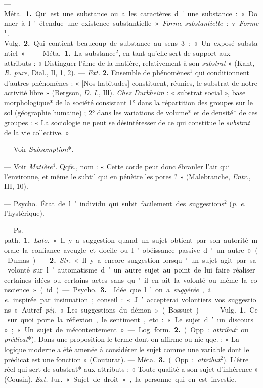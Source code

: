 \begin{itemize}[leftmargin=1cm, label=, itemsep=1pt]
 — \si{Méta.} {\bf 1.} Qui est une substance ou a les
caractères d'une substance : « Donner à l'étendue une existence
substantielle ». {\it Forme substantielle} : v. {\it Forme}$^1$. —
\si{Vulg.}  {\bf 2.} Qui contient beaucoup de substance au sens 3 : « Un
exposé substantiel. »

 — \si{Méta.} {\bf 1.} La
substance$^2$, en tant qu’elle sert de
support aux attributs : « Distinguer l'âme de la matière, relativement à son
{\it substrat} » (Kant, {\it R. pure}, Dial., Il, 1, 2). — {\it Ext.}
{\bf 2.} Ensemble de phénomènes$^1$ qui conditionnent d’autres phénomènes :
« [Nos habitudes] constituent, réunies, le substrat de notre activité libre
» (Bergson, {\it D. I.}, Ill). {\it Chez Durkheim} : « substrat social »,
base morphologique* de la société consistant 1° dans la répartition des
groupes sur le sol (géographie humaine) ; 2° dans les variations de volume*
et de densité* de ces groupes : « La sociologie ne peut se désintéresser de
ce qui constitue le {\it substrat} de la vie collective. »

 — Voir {\it Subsomption}*.

 — Voir {\it Matière}$^4$. Qqfs., nom : « Cette corde peut donc
ébranler l’air qui l’environne, et même le subtil qui en pénètre les pores ?
» (Malebranche, {\it Entr.}, III, 10).

 — \si{Psycho.} État de l’individu qui subit facilement
des suggestions$^2$ ({\it p. e.} l’hystérique).

 — \si{Ps. path.} {\bf 1.} {\it Lato.} « Il y a suggestion
quand un sujet obtient par son autorité morale la confiance aveugle et
docile ou l'obéissance passive d’un autre » (Dumas). — {\bf 2.} {\it Str.} «
Il y a encore suggestion lorsqu’un sujet agit par sa volonté sur
l’automatisme d’un autre sujet au point de lui faire réaliser certaines
idées ou certains actes sans qu'il en ait la volonté ou même la conscience
» (id.).

— \si{Psycho.} {\bf 3.}  Idée que l’on a {\it suggérée},
{\it i. e.} inspirée par insinuation ; conseil : « J’accepterai volontiers
vos suggestions ». Autref. {\it péj.} « Les suggestions du démon » (Bossuet).

 —  \si{Vulg.} {\bf 1.} Ce sur quoi porte la
réflexion, le sentiment, etc. : « Le sujet d’un discours »; « Un sujet de
mécontentement ». — \si{Log. form.}  {\bf 2.} (Opp. : {\it attribut}$^1$ ou
{\it prédicat}*). Dans une proposition le terme dont on affirme ou nie
qqc. : « La logique moderne a été amenée à considérer le sujet comme une
variable dont le prédicat est une fonction » (Couturat). — \si{Méta.}
{\bf 3.} (Opp. : {\it attribut}$^2$). L'être réel qui sert de substrat* aux
attributs : « Toute qualité a son sujet d’inhérence » (Cousin). {\it Ext.}
\si{Jur.} « Sujet de droit », la personne qui en est investie.


\end{itemize}
